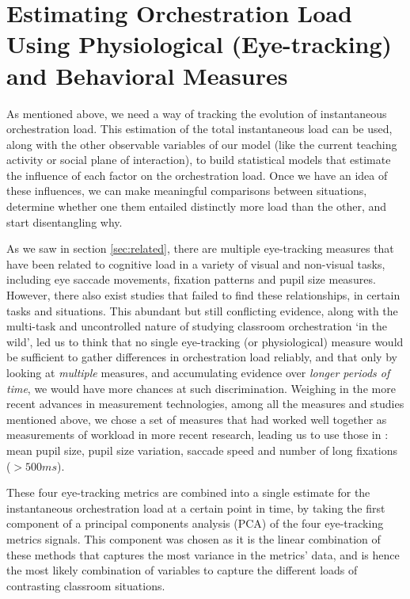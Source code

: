 \documentclass[10pt,journal,compsoc]{IEEEtran}
\begin{document}
\section{Estimating Orchestration Load Using Physiological (Eye-tracking) and Behavioral Measures}
\label{sec:measures}

As mentioned above, we need a way of tracking the evolution of instantaneous orchestration load. This estimation of the total instantaneous load can be used, along with the other observable variables of our model (like the current teaching activity or social plane of interaction), to build statistical models that estimate the influence of each factor on the orchestration load. Once we have an idea of these influences, we can make meaningful comparisons between situations, determine whether one them entailed distinctly more load than the other, and start disentangling why.

As we saw in section \ref{sec:related}, there are multiple eye-tracking measures that have been related to cognitive load in a variety of visual and non-visual tasks, including eye saccade movements,  %
fixation patterns %
and pupil size measures. %
However, there also exist studies that failed to find these relationships, in certain tasks and situations. %
This abundant but still conflicting evidence, along with the multi-task and uncontrolled nature of studying classroom orchestration `in the wild', led us to think that no single eye-tracking (or physiological) measure would be sufficient to gather differences in orchestration load reliably, and that only by looking at \textit{multiple} measures, and accumulating evidence over \textit{longer periods of time}, we would have more chances at such discrimination. Weighing in the more recent advances in measurement technologies, among all the measures and studies mentioned above, we chose a set of measures that had worked well together as measurements of workload in more recent research, leading us to use those in \cite{Buettner2013}: mean pupil size, pupil size variation, saccade speed and number of long fixations ($>500ms$). 

These four eye-tracking metrics are combined into a single estimate for the instantaneous orchestration load at a certain point in time, by taking the first component of a principal components analysis (PCA) of the four eye-tracking metrics signals. This component was chosen as it is the linear combination of these methods that captures the most variance in the metrics' data, and is hence the most likely combination of variables to capture the different loads of contrasting classroom situations.
\end{document}
